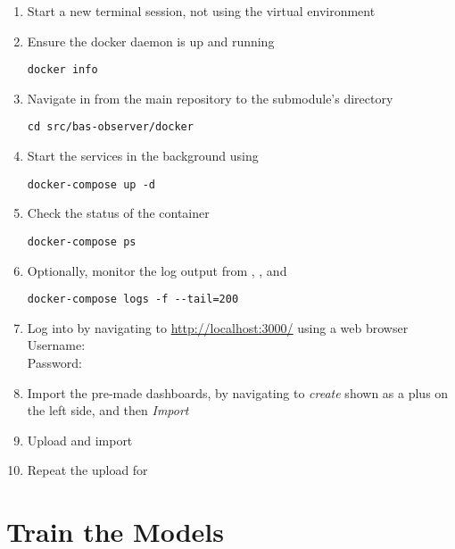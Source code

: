 \begin{enumerate}
	\item Start a new terminal session, not using the virtual environment
	\item Ensure the docker daemon is up and running
\begin{lstlisting}
docker info
\end{lstlisting}
	\item Navigate in from the main repository to the  submodule's  directory
\begin{lstlisting}
cd src/bas-observer/docker
\end{lstlisting}
	\item Start the services in the background using 
\begin{lstlisting}
docker-compose up -d
\end{lstlisting}
	\item Check the status of the container
\begin{lstlisting}
docker-compose ps
\end{lstlisting}
	\item Optionally, monitor the log output from , , and 
\begin{lstlisting}
docker-compose logs -f --tail=200
\end{lstlisting}
	\item Log into  by navigating to \url{http://localhost:3000/} using a web browser\\
		Username: \\
		Password: 
	\item Import the pre-made dashboards, by navigating to \emph{create} shown as a plus on the left side, and then \emph{Import}
	\item Upload and import\\
	\item Repeat the upload for \\
\end{enumerate}

\section{Train the Models}
\label{app:reproduce:train}

